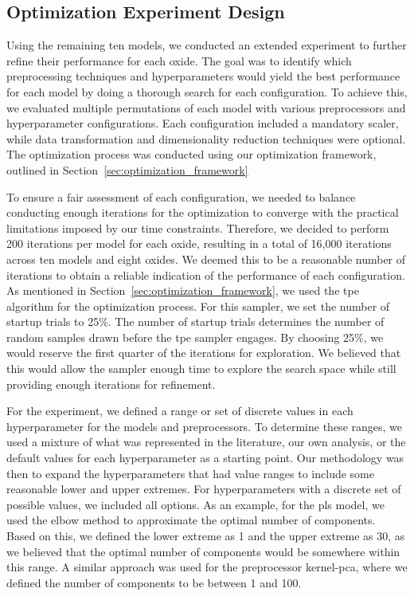 \subsection{Optimization Experiment Design}\label{subsec:optimization_experiment_design}
Using the remaining ten models, we conducted an extended experiment to further refine their performance for each oxide. 
The goal was to identify which preprocessing techniques and hyperparameters would yield the best performance for each model by doing a thorough search for each configuration. 
To achieve this, we evaluated multiple permutations of each model with various preprocessors and hyperparameter configurations. 
Each configuration included a mandatory scaler, while data transformation and dimensionality reduction techniques were optional. 
The optimization process was conducted using our optimization framework, outlined in Section~\ref{sec:optimization_framework}

To ensure a fair assessment of each configuration, we needed to balance conducting enough iterations for the optimization to converge with the practical limitations imposed by our time constraints.
Therefore, we decided to perform 200 iterations per model for each oxide, resulting in a total of 16,000 iterations across ten models and eight oxides.
We deemed this to be a reasonable number of iterations to obtain a reliable indication of the performance of each configuration.
As mentioned in Section~\ref{sec:optimization_framework}, we used the \gls{tpe} algorithm for the optimization process.
For this sampler, we set the number of startup trials to 25\%.
The number of startup trials determines the number of random samples drawn before the \gls{tpe} sampler engages.
By choosing 25\%, we would reserve the first quarter of the iterations for exploration.
We believed that this would allow the sampler enough time to explore the search space while still providing enough iterations for refinement. 

For the experiment, we defined a range or set of discrete values in each hyperparameter for the models and preprocessors. 
To determine these ranges, we used a mixture of what was represented in the literature, our own analysis, or the default values for each hyperparameter as a starting point. 
Our methodology was then to expand the hyperparameters that had value ranges to include some reasonable lower and upper extremes. 
For hyperparameters with a discrete set of possible values, we included all options. 
As an example, for the \gls{pls} model, we used the elbow method to approximate the optimal number of components. 
Based on this, we defined the lower extreme as 1 and the upper extreme as 30, as we believed that the optimal number of components would be somewhere within this range. 
A similar approach was used for the preprocessor \gls{kernel-pca}, where we defined the number of components to be between 1 and 100.

